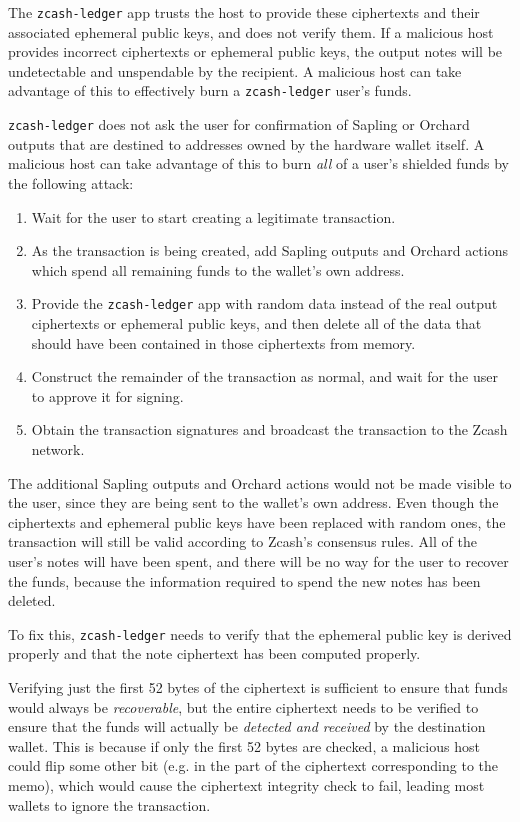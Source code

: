\documentclass[10pt,titlepage]{article}
\begin{document}
The \texttt{zcash-ledger} app trusts the host to provide these ciphertexts and
their associated ephemeral public keys, and does not verify them. If a malicious
host provides incorrect ciphertexts or ephemeral public keys, the output notes
will be undetectable and unspendable by the recipient. A malicious host can take
advantage of this to effectively burn a \texttt{zcash-ledger} user's funds.

\texttt{zcash-ledger} does not ask the user for confirmation of Sapling or
Orchard outputs that are destined to addresses owned by the hardware wallet
itself. A malicious host can take advantage of this to burn \emph{all} of a
user's shielded funds by the following attack:

\begin{enumerate}
\item Wait for the user to start creating a legitimate transaction.
\item As the transaction is being created, add Sapling outputs and Orchard actions which spend all remaining funds to the wallet's own address.
\item Provide the \texttt{zcash-ledger} app with random data instead of the real output ciphertexts or ephemeral public keys, and then delete all of the data that should have been contained in those ciphertexts from memory.
\item Construct the remainder of the transaction as normal, and wait for the user to approve it for signing.
\item Obtain the transaction signatures and broadcast the transaction to the Zcash network.
\end{enumerate}

The additional Sapling outputs and Orchard actions would not be made visible to
the user, since they are being sent to the wallet's own address. Even though the
ciphertexts and ephemeral public keys have been replaced with random ones, the
transaction will still be valid according to Zcash's consensus rules. All of the
user's notes will have been spent, and there will be no way for the user to
recover the funds, because the information required to spend the new notes
has been deleted.

To fix this, \texttt{zcash-ledger} needs to verify that the ephemeral public key
is derived properly and that the note ciphertext has been computed properly. 

Verifying just the first 52 bytes of the ciphertext is sufficient to ensure that
funds would always be \emph{recoverable}, but the entire ciphertext needs to be
verified to ensure that the funds will actually be \emph{detected and received}
by the destination wallet. This is because if only the first 52 bytes are
checked, a malicious host could flip some other bit (e.g. in the part of the
ciphertext corresponding to the memo), which would cause the ciphertext
integrity check to fail, leading most wallets to ignore the transaction. 
\end{document}

